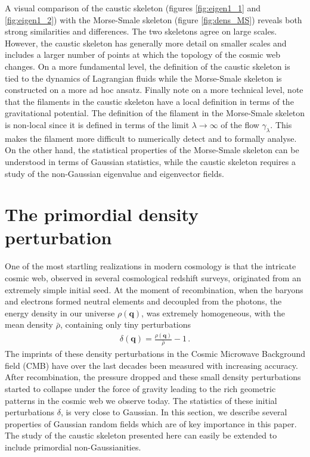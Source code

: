 \documentclass[a4paper, 11pt]{article}
\begin{document}
A visual comparison of the caustic skeleton (figures \ref{fig:eigen1_1} and \ref{fig:eigen1_2}) with the Morse-Smale skeleton (figure \ref{fig:dens_MS}) reveals both strong similarities and differences. The two skeletons agree on large scales. However, the caustic skeleton has generally more detail on smaller scales and includes a larger number of points at which the topology of the cosmic web changes. On a more fundamental level, the definition of the caustic skeleton is tied to the dynamics of Lagrangian fluids while the Morse-Smale skeleton is constructed on a more ad hoc ansatz. Finally note on a more technical level, note that the filaments in the caustic skeleton have a local definition in terms of the gravitational potential. The definition of the filament in the Morse-Smale skeleton is non-local since it is defined in terms of the limit $\lambda\to\infty$ of the flow $\gamma_\lambda$. This makes the filament more difficult to numerically detect and to formally analyse. On the other hand, the statistical properties of the Morse-Smale skeleton can be understood in terms of Gaussian statistics, while the caustic skeleton requires a study of the non-Gaussian eigenvalue and eigenvector fields.


\section{The primordial density perturbation}
One of the most startling realizations in modern cosmology is that the intricate cosmic web, observed in several cosmological redshift surveys, originated from an extremely simple initial seed. At the moment of recombination, when the baryons and electrons formed neutral elements and decoupled from the photons, the energy density in our universe $\rho(\bm{q})$, was extremely homogeneous, with the mean density $\bar{\rho}$, containing only tiny perturbations
\begin{align}
\delta(\bm{q}) = \frac{\rho(\bm{q})}{\bar{\rho}} -1\,.
\end{align}
The imprints of these density perturbations in the Cosmic Microwave Background field (CMB) have over the last decades been measured with increasing accuracy. After recombination, the pressure dropped and these small density perturbations started to collapse under the force of gravity leading to the rich geometric patterns in the cosmic web we observe today. The statistics of these initial perturbations $\delta$, is very close to Gaussian. In this section, we describe several properties of Gaussian random fields which are of key importance in this paper. The study of the caustic skeleton presented here can easily be extended to include primordial non-Gaussianities.
\end{document}
